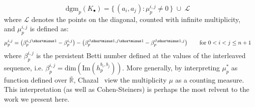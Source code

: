 \documentclass[10pt]{article}
\newtheorem{definition}{Definition}
\begin{document}
\begin{equation}
\mathrm{dgm}_p(K_\bullet) = \{ \, (a_i, a_j) :  \mu_p^{i,j} \neq 0 \, \} \; \cup \; \mathcal{L}	
\end{equation}
where $\mathcal{L}$ denotes the points on the diagonal, counted with infinite multiplicity, and $\mu_p^{i,j}$ is defined as: 
  $$\mu_p^{i,j} = \left(\beta_p^{i,j\shortminus1} - \beta_p^{i,j} \right) - \left(\beta_p^{i\shortminus1,j\shortminus1} - \beta_p^{i\shortminus1,j} \right) \quad\quad \text{for } 0 < i < j \leq n+ 1 $$
where $\beta_p^{i,j}$ is the persistent Betti number defined at the values of the interleaved sequence, i.e. $\beta_p^{i,j} = \mathrm{dim}(\mathrm{Im}(h_p^{b_i, b_j}))$. More generally, by interpreting $\mu_p^\ast$ as function defined over $\bar{\mathbb{R}}$, Chazal~\cite{} view the multiplicity $\mu$ as a counting measure. This interpretation (as well as Cohen-Steiners) is perhaps the most relvent to the work we present here. 





\end{document}
